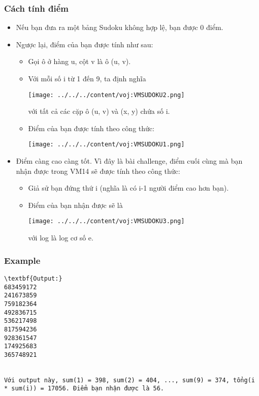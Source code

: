 \subsubsection{Cách tính điểm}
\begin{itemize}
	\item Nếu bạn đưa ra một bảng Sudoku không hợp lệ, bạn được 0 điểm.
	\item Ngược lại, điểm của bạn được tính như sau:
\begin{itemize}
	\item Gọi ô ở hàng u, cột v là ô (u, v).
	\item Với mỗi số i từ 1 đến 9, ta định nghĩa



\texttt{[image: ../../../content/voj:VMSUDOKU2.png]}


với tất cả các cặp ô (u, v) và (x, y) chứa số i.
	\item Điểm của bạn được tính theo công thức:



\texttt{[image: ../../../content/voj:VMSUDOKU1.png]}
\end{itemize}
	\item Điểm càng cao càng tốt. Vì đây là bài challenge, điểm cuối cùng mà bạn nhận được trong VM14 sẽ được tính theo công thức:
\begin{itemize}
	\item Giả sử bạn đứng thứ i (nghĩa là có i-1 người điểm cao hơn bạn).
	\item Điểm của bạn nhận được sẽ là



\texttt{[image: ../../../content/voj:VMSUDOKU3.png]}


với log là log cơ số e.
\end{itemize}
\end{itemize}

\subsubsection{Example}
\begin{verbatim}
\textbf{Output:}
683459172
241673859
759182364
492836715
536217498
817594236
928361547
174925683
365748921


Với output này, sum(1) = 398, sum(2) = 404, ..., sum(9) = 374, tổng(i * sum(i)) = 17056. Điểm bạn nhận được là 56.
\end{verbatim}
